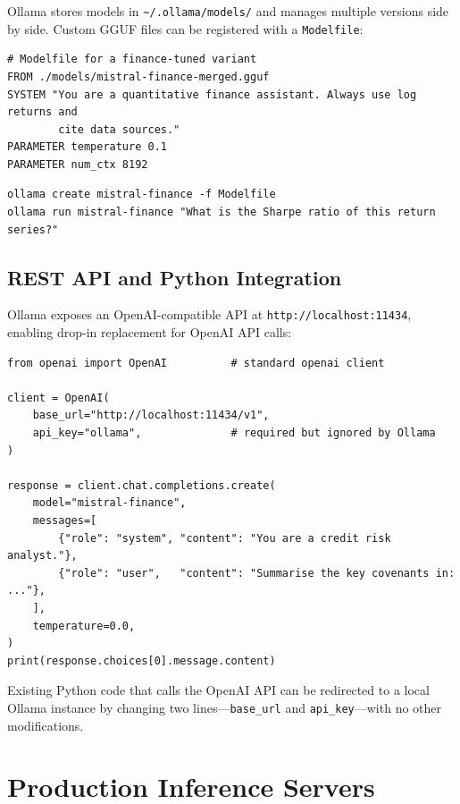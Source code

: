 Ollama stores models in \texttt{\textasciitilde/.ollama/models/} and manages
multiple versions side by side.  Custom GGUF files can be registered with a
\texttt{Modelfile}:

\begin{verbatim}
# Modelfile for a finance-tuned variant
FROM ./models/mistral-finance-merged.gguf
SYSTEM "You are a quantitative finance assistant. Always use log returns and
        cite data sources."
PARAMETER temperature 0.1
PARAMETER num_ctx 8192
\end{verbatim}

\begin{verbatim}
ollama create mistral-finance -f Modelfile
ollama run mistral-finance "What is the Sharpe ratio of this return series?"
\end{verbatim}

\subsection{REST API and Python Integration}
\label{app:hf:ollama-api}

Ollama exposes an OpenAI-compatible API at \texttt{http://localhost:11434},
enabling drop-in replacement for OpenAI API calls:

\begin{verbatim}
from openai import OpenAI          # standard openai client

client = OpenAI(
    base_url="http://localhost:11434/v1",
    api_key="ollama",              # required but ignored by Ollama
)

response = client.chat.completions.create(
    model="mistral-finance",
    messages=[
        {"role": "system", "content": "You are a credit risk analyst."},
        {"role": "user",   "content": "Summarise the key covenants in: ..."},
    ],
    temperature=0.0,
)
print(response.choices[0].message.content)
\end{verbatim}

Existing Python code that calls the OpenAI API can be redirected to a local
Ollama instance by changing two lines---\texttt{base\_url} and
\texttt{api\_key}---with no other modifications.

\section{Production Inference Servers}
\label{app:hf:servers}

